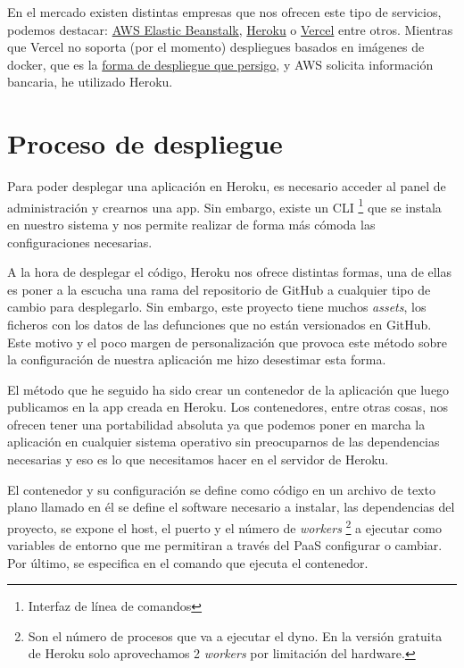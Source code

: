 En el mercado existen distintas empresas que nos ofrecen este tipo de servicios, podemos
destacar: \href{https://aws.amazon.com/es/elasticbeanstalk/}{AWS Elastic Beanstalk},
\href{https://dashboard.heroku.com/login}{Heroku} o \href{https://vercel.com/}{Vercel}
entre otros. Mientras que Vercel no soporta (por el momento) despliegues basados en imágenes de docker,
que es la \hyperref[sec:proceso-despliegue]{forma de despliegue que persigo}, y AWS
solicita información bancaria, he utilizado Heroku.

\section{Proceso de despliegue}
\label{sec:proceso-despliegue}
Para poder desplegar una aplicación en Heroku, es necesario acceder al panel de
administración y crearnos una app. Sin embargo, existe un CLI \footnote{Interfaz de
línea de comandos} que se instala en nuestro sistema y nos permite realizar de forma más
cómoda las configuraciones necesarias.

A la hora de desplegar el código, Heroku nos ofrece distintas formas, una de ellas es
poner a la escucha una rama del repositorio de GitHub a cualquier tipo de cambio para
desplegarlo. Sin embargo, este proyecto tiene muchos \textit{assets}, los ficheros con
los datos de las defunciones que no están versionados en GitHub. Este
motivo y el poco margen de personalización que provoca este método sobre la
configuración de nuestra aplicación me hizo desestimar esta forma.

El método que he seguido ha sido crear un contenedor de la aplicación que luego publicamos
en la app creada en Heroku. Los contenedores, entre otras cosas, nos ofrecen tener una portabilidad absoluta
ya que podemos poner en marcha la aplicación en cualquier sistema operativo sin
preocuparnos de las dependencias necesarias y eso es lo que necesitamos hacer en el
servidor de Heroku.

El contenedor y su configuración se define como código en un archivo de texto plano
llamado  en él se define el software necesario a instalar, las
dependencias del proyecto, se expone el host, el puerto y el número de \textit{workers}
\footnote{Son el número de procesos que va a ejecutar el dyno. En la versión gratuita de Heroku solo aprovechamos 2 \textit{workers} por
limitación del hardware.} a
ejecutar como variables de entorno que me permitiran a través del PaaS configurar o cambiar.
Por último, se especifica en el comando que ejecuta el contenedor.


